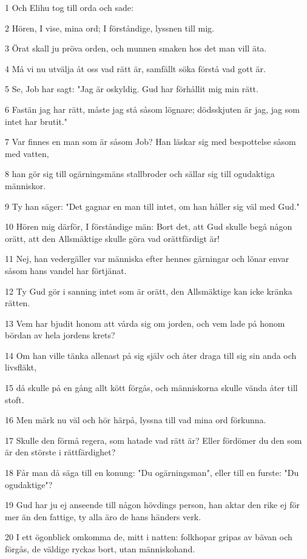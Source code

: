 \par 1 Och Elihu tog till orda och sade:
\par 2 Hören, I vise, mina ord; I förståndige, lyssnen till mig.
\par 3 Örat skall ju pröva orden, och munnen smaken hos det man vill äta.
\par 4 Må vi nu utvälja åt oss vad rätt är, samfällt söka förstå vad gott är.
\par 5 Se, Job har sagt: "Jag är oskyldig. Gud har förhållit mig min rätt.
\par 6 Fastän jag har rätt, måste jag stå såsom lögnare; dödsskjuten är jag, jag som intet har brutit."
\par 7 Var finnes en man som är såsom Job? Han läskar sig med bespottelse såsom med vatten,
\par 8 han gör sig till ogärningsmäns stallbroder och sällar sig till ogudaktiga människor.
\par 9 Ty han säger: "Det gagnar en man till intet, om han håller sig väl med Gud."
\par 10 Hören mig därför, I förståndige män: Bort det, att Gud skulle begå någon orätt, att den Allsmäktige skulle göra vad orättfärdigt är!
\par 11 Nej, han vedergäller var människa efter hennes gärningar och lönar envar såsom hans vandel har förtjänat.
\par 12 Ty Gud gör i sanning intet som är orätt, den Allsmäktige kan icke kränka rätten.
\par 13 Vem har bjudit honom att vårda sig om jorden, och vem lade på honom bördan av hela jordens krets?
\par 14 Om han ville tänka allenast på sig själv och åter draga till sig sin anda och livsfläkt,
\par 15 då skulle på en gång allt kött förgås, och människorna skulle vända åter till stoft.
\par 16 Men märk nu väl och hör härpå, lyssna till vad mina ord förkunna.
\par 17 Skulle den förmå regera, som hatade vad rätt är? Eller fördömer du den som är den störste i rättfärdighet?
\par 18 Får man då säga till en konung: "Du ogärningsman", eller till en furste: "Du ogudaktige"?
\par 19 Gud har ju ej anseende till någon hövdings person, han aktar den rike ej för mer än den fattige, ty alla äro de hans händers verk.
\par 20 I ett ögonblick omkomma de, mitt i natten: folkhopar gripas av bävan och förgås, de väldige ryckas bort, utan människohand.
